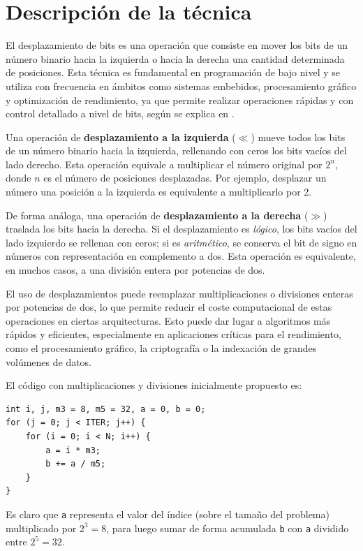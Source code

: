 \documentclass[11pt,a4paper,twoside]{article}
\theoremstyle{definition}
\begin{document}
	\section{Descripción de la técnica}

	El desplazamiento de bits es una operación que consiste en mover los bits de un número binario hacia la izquierda o hacia la derecha una cantidad determinada de posiciones. Esta técnica es fundamental en programación de bajo nivel y se utiliza con frecuencia en ámbitos como sistemas embebidos, procesamiento gráfico y optimización de rendimiento, ya que permite realizar operaciones rápidas y con control detallado a nivel de bits, según se explica en \cite{burrell}.
	
	Una operación de \textbf{desplazamiento a la izquierda} ($\ll$) mueve todos los bits de un número binario hacia la izquierda, rellenando con ceros los bits vacíos del lado derecho. Esta operación equivale a multiplicar el número original por $2^n$, donde $n$ es el número de posiciones desplazadas. Por ejemplo, desplazar un número una posición a la izquierda es equivalente a multiplicarlo por 2.
	
	De forma análoga, una operación de \textbf{desplazamiento a la derecha} ($\gg$) traslada los bits hacia la derecha. Si el desplazamiento es \emph{lógico}, los bits vacíos del lado izquierdo se rellenan con ceros; si es \emph{aritmético}, se conserva el bit de signo en números con representación en complemento a dos. Esta operación es equivalente, en muchos casos, a una división entera por potencias de dos.
	
	El uso de desplazamientos puede reemplazar multiplicaciones o divisiones enteras por potencias de dos, lo que permite reducir el coste computacional de estas operaciones en ciertas arquitecturas. Esto puede dar lugar a algoritmos más rápidos y eficientes, especialmente en aplicaciones críticas para el rendimiento, como el procesamiento gráfico, la criptografía o la indexación de grandes volúmenes de datos.
	
	El código con multiplicaciones y divisiones inicialmente propuesto es:
	\begin{verbatim}
int i, j, m3 = 8, m5 = 32, a = 0, b = 0;
for (j = 0; j < ITER; j++) {
	for (i = 0; i < N; i++) {
		a = i * m3;
		b += a / m5;
	}
}
	\end{verbatim}

	Es claro que \texttt{a} representa el valor del índice (sobre el tamaño del problema) multiplicado por $2^3=8$, para luego sumar de forma acumulada \texttt{b} con \texttt{a} dividido entre $2^5=32$.
\end{document}
